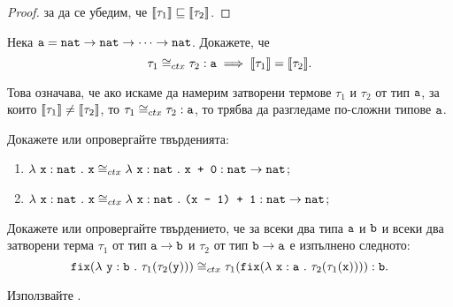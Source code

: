 \begin{proof}
  за да се убедим, че $\llbracket{\tau_1}\rrbracket \sqsubseteq \llbracket{\tau_2}\rrbracket$.
\end{proof}

\begin{problem}
  \label{prob:context:chain:implication}
  Нека $\texttt{a} = \texttt{nat} \to \texttt{nat} \to \cdots \to \texttt{nat}$.
  Докажете, че 
  \[\tau_1 \cong_{ctx} \tau_2 : \texttt{a} \implies \llbracket{\tau_1}\rrbracket = \llbracket{\tau_2}\rrbracket.\]  
\end{problem}

Това означава, че ако искаме да намерим затворени термове $\tau_1$ и $\tau_2$ от тип $\texttt{a}$, за които $\llbracket{\tau_1}\rrbracket \neq \llbracket{\tau_2}\rrbracket$, то $\tau_1 \cong_{ctx} \tau_2 : \texttt{a}$, то трябва да разгледаме по-сложни типове $\texttt{a}$.

\begin{problem}
  Докажете или опровергайте твърденията:
  \begin{enumerate}[(1)]
  \item
    $\lambda~\texttt{x}:\texttt{nat}~.~{\texttt{x}} \cong_{ctx} \lambda~\texttt{x}:\texttt{nat}~.~{\texttt{x + 0}} : \texttt{nat}\to\texttt{nat}$;
  \item
    $\lambda~\texttt{x}:\texttt{nat}~.~{\texttt{x}} \cong_{ctx} \lambda~\texttt{x}:\texttt{nat}~.~{\texttt{(x - 1) + 1}} : \texttt{nat}\to\texttt{nat}$;
  \end{enumerate}

\end{problem}

\begin{problem}
  Докажете или опровергайте твърдението, че за всеки два типа $\texttt{a}$ и $\texttt{b}$
  и всеки два затворени терма $\tau_1$ от тип $\texttt{a}\to\texttt{b}$ и $\tau_2$ от тип $\texttt{b}\to\texttt{a}$
  е изпълнено следното:  
  \[\texttt{fix}(\lambda~\texttt{y}:\texttt{b}~.~{\tau_1(\tau_2(\texttt{y}))}) \cong_{ctx} \tau_1(\texttt{fix}(\lambda~\texttt{x}:\texttt{a}~.~{\tau_2(\tau_1(\texttt{x}))})) : \texttt{b}.\]  
\end{problem}
\begin{hint}
  Използвайте .
\end{hint}


